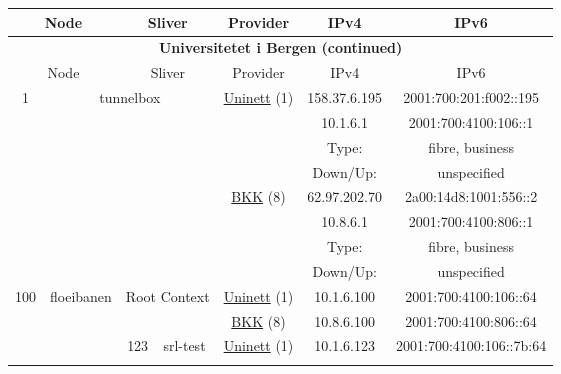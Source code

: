 \begin{small}
\begin{center}
\begin{longtable}{|c|c|c|c|c|c|c|c|}
 \multicolumn{2}{|p{8em}|}{Node} & \multicolumn{2}{|p{8em}|}{Sliver} & \multicolumn{2}{|p{8em}|}{Provider} & IPv4 & IPv6 \\ \hline
\endfirsthead
\hline
 \multicolumn{8}{|c|}{\textbf{Universitetet i Bergen (continued)}} \\ \hline
 \multicolumn{2}{|p{8em}|}{Node} & \multicolumn{2}{|p{8em}|}{Sliver} & \multicolumn{2}{|p{8em}|}{Provider} & IPv4 & IPv6 \\ \hline
\endhead
 \multirow{8}{*}{\tiny{1}} & \multicolumn{3}{|c|}{\multirow{8}{*}{\tiny{tunnelbox}}} & \multicolumn{2}{|c|}{\multirow{4}{*}{\tiny{\href{https://www.uninett.no}{Uninett} (1)}}} & \tiny{158.37.6.195} & \tiny{2001:700:201:f002::195} \\* \cline{7-7}\cline{8-8}
  & \multicolumn{3}{|c|}{} & \multicolumn{2}{|c|}{} & \tiny{10.1.6.1} & \tiny{2001:700:4100:106::1} \\* \cline{7-7}\cline{8-8}
  & \multicolumn{3}{|c|}{} & \multicolumn{2}{|c|}{} & Type: & fibre, business \\* \cline{7-7}\cline{8-8}
  & \multicolumn{3}{|c|}{} & \multicolumn{2}{|c|}{} & Down/Up:  & unspecified \\* \cline{5-5}\cline{6-6}\cline{7-7}\cline{8-8}
  & \multicolumn{3}{|c|}{} & \multicolumn{2}{|c|}{\multirow{4}{*}{\tiny{\href{http://bkk.no}{BKK} (8)}}} & \tiny{62.97.202.70} & \tiny{2a00:14d8:1001:556::2} \\* \cline{7-7}\cline{8-8}
  & \multicolumn{3}{|c|}{} & \multicolumn{2}{|c|}{} & \tiny{10.8.6.1} & \tiny{2001:700:4100:806::1} \\* \cline{7-7}\cline{8-8}
  & \multicolumn{3}{|c|}{} & \multicolumn{2}{|c|}{} & Type: & fibre, business \\* \cline{7-7}\cline{8-8}
  & \multicolumn{3}{|c|}{} & \multicolumn{2}{|c|}{} & Down/Up:  & unspecified \\ \hline
 \multirow{18}{*}{\tiny{100}} & \multicolumn{1}{|l|}{\multirow{18}{*}{\tiny{floeibanen}}} & \multicolumn{2}{|c|}{\multirow{2}{*}{\tiny{Root Context}}} & \multicolumn{2}{|c|}{\tiny{\href{https://www.uninett.no}{Uninett} (1)}} & \tiny{10.1.6.100} & \tiny{2001:700:4100:106::64} \\* \cline{5-5}\cline{6-6}\cline{7-7}\cline{8-8}
  &  & \multicolumn{2}{|c|}{} & \multicolumn{2}{|c|}{\tiny{\href{http://bkk.no}{BKK} (8)}} & \tiny{10.8.6.100} & \tiny{2001:700:4100:806::64} \\* \cline{3-3}\cline{4-4}\cline{5-5}\cline{6-6}\cline{7-7}\cline{8-8}
  &  & \multirow{2}{*}{\tiny{123}} & \multicolumn{1}{|l|}{\multirow{2}{*}{\tiny{srl-test}}} & \multicolumn{2}{|c|}{\tiny{\href{https://www.uninett.no}{Uninett} (1)}} & \tiny{10.1.6.123} & \tiny{2001:700:4100:106::7b:64} \\* \cline{5-5}\cline{6-6}\cline{7-7}\cline{8-8}

\end{longtable}
\end{center}
\end{small}
